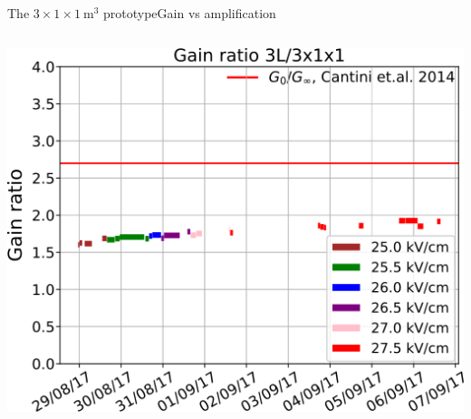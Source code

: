 \documentclass[10pt]{beamer}
\begin{document}
\begin{frame}{The \texorpdfstring{$3 \times 1 \times \SI{1}{\meter\cubed}$}{311} prototype}{Gain vs amplification}
\begin{scriptsize}
\begin{columns}
\begin{column}{0.5\textwidth}
    				\vspace{0.2cm}
    				\includegraphics[width=.9\textwidth]{figures/311/ratio_vs_time.png}\\
    			\end{column}
    		\end{columns}
    	\end{scriptsize}
    \end{frame}
    
\end{document}
